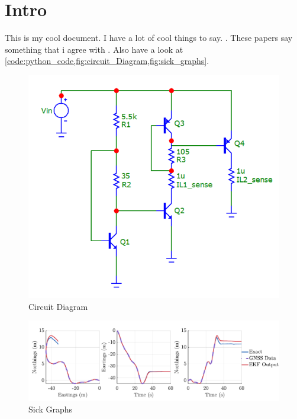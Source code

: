 \section{Intro}

This is my cool document. I have a lot of cool things to say. . These papers say something that i agree with \cite{normal_distribution_wiki_page,latex_project_website}. Also have a look at \cref{code:python_code,fig:circuit_Diagram,fig:sick_graphs}.

\begin{figure}[ht]
    \centering
    \includegraphics[width=\linewidth]{figures/c3.png} %
    \centering
    \caption{Circuit Diagram} %
    \label{fig:circuit_Diagram} %
\end{figure}

\begin{figure}[ht]
    \centering
    \includegraphics[width=\linewidth]{figures/R6.pdf} %
    \centering
    \caption{Sick Graphs} %
    \label{fig:sick_graphs} %
\end{figure}


